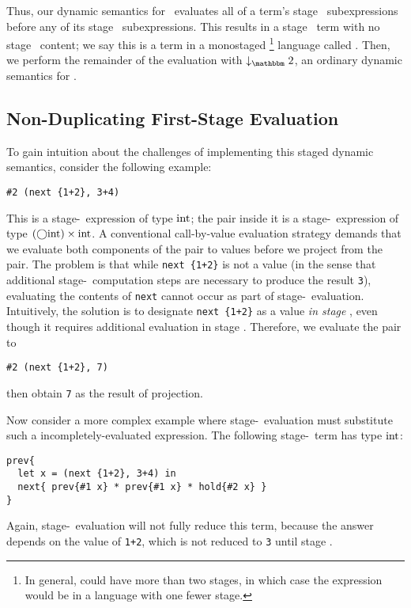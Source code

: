 Thus, our dynamic semantics for \lang\ evaluates all of a term's stage \bbone\
subexpressions before any of its stage \bbtwo\ subexpressions. This results in a
stage \bbtwo\ term with no stage \bbone\ content; we say this is a term in a
monostaged
\footnote{In general, \lang could have more than two stages, in which case the
expression would be in a language with one fewer stage.}
language called \langTwo. Then, we perform the remainder of the evaluation with 
$\tworedsym$, an ordinary dynamic semantics for \langTwo.

\subsection{Non-Duplicating First-Stage Evaluation}

To gain intuition about the challenges of implementing this staged dynamic
semantics, consider the following example:
\begin{lstlisting}
#2 (next {1+2}, 3+4)
\end{lstlisting}
This is a stage-\bbone\ expression of type ${\rm int}$; the pair inside it is a
stage-\bbone\ expression of type $(\bigcirc{\rm int})\times{\rm int}$. A conventional
call-by-value evaluation strategy demands that we evaluate both components of
the pair to values before we project from the pair. The problem is that
while \verb|next {1+2}| is not a value (in the sense that additional
stage-\bbtwo\ computation steps are necessary to produce the result \verb|3|), evaluating the contents of \verb|next| cannot occur as part of stage-\bbone\ evaluation.
Intuitively, the solution is to designate \verb|next {1+2}| as a value \emph{in
stage \bbone}, even though it requires additional evaluation in stage \bbtwo.
Therefore, we evaluate the pair to
\begin{lstlisting}
#2 (next {1+2}, 7)
\end{lstlisting}
then obtain \verb|7| as the result of projection.

Now consider a more complex example where 
stage-\bbone\ evaluation must substitute such a incompletely-evaluated
expression. The following stage-\bbtwo\ term has type ${\rm int}$:
\begin{lstlisting} 
prev{
  let x = (next {1+2}, 3+4) in
  next{ prev{#1 x} * prev{#1 x} * hold{#2 x} }
}
\end{lstlisting}
Again, stage-\bbone\ evaluation will not fully reduce this term, because the answer
depends on the value of \verb|1+2|, which is not reduced to \verb|3| until
stage \bbtwo.

